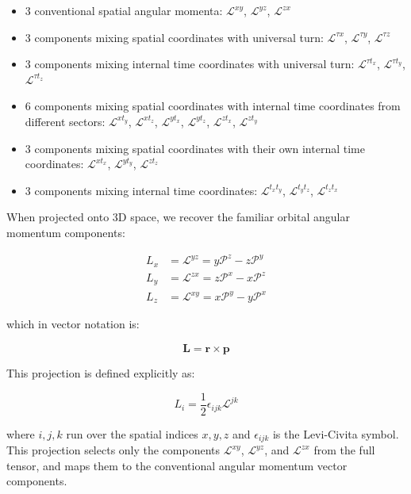 \documentclass{article}
\begin{document}
\begin{itemize}
\item 3 conventional spatial angular momenta: $\mathcal{L}^{xy}$, $\mathcal{L}^{yz}$, $\mathcal{L}^{zx}$
\item 3 components mixing spatial coordinates with universal turn: $\mathcal{L}^{\tau x}$, $\mathcal{L}^{\tau y}$, $\mathcal{L}^{\tau z}$
\item 3 components mixing internal time coordinates with universal turn: $\mathcal{L}^{\tau t_x}$, $\mathcal{L}^{\tau t_y}$, $\mathcal{L}^{\tau t_z}$
\item 6 components mixing spatial coordinates with internal time coordinates from different sectors: $\mathcal{L}^{x t_y}$, $\mathcal{L}^{x t_z}$, $\mathcal{L}^{y t_x}$, $\mathcal{L}^{y t_z}$, $\mathcal{L}^{z t_x}$, $\mathcal{L}^{z t_y}$
\item 3 components mixing spatial coordinates with their own internal time coordinates: $\mathcal{L}^{x t_x}$, $\mathcal{L}^{y t_y}$, $\mathcal{L}^{z t_z}$
\item 3 components mixing internal time coordinates: $\mathcal{L}^{t_x t_y}$, $\mathcal{L}^{t_y t_z}$, $\mathcal{L}^{t_z t_x}$
\end{itemize}

When projected onto 3D space, we recover the familiar orbital angular momentum components:

\begin{align}
L_x &= \mathcal{L}^{yz} = y\mathcal{P}^z - z\mathcal{P}^y \\
L_y &= \mathcal{L}^{zx} = z\mathcal{P}^x - x\mathcal{P}^z \\
L_z &= \mathcal{L}^{xy} = x\mathcal{P}^y - y\mathcal{P}^x
\end{align}

which in vector notation is:

\begin{equation}
\mathbf{L} = \mathbf{r} \times \mathbf{p}
\end{equation}

This projection is defined explicitly as:

\begin{equation}
L_i = \frac{1}{2}\epsilon_{ijk}\mathcal{L}^{jk}
\end{equation}

where $i,j,k$ run over the spatial indices $x,y,z$ and $\epsilon_{ijk}$ is the Levi-Civita symbol. This projection selects only the components $\mathcal{L}^{xy}$, $\mathcal{L}^{yz}$, and $\mathcal{L}^{zx}$ from the full tensor, and maps them to the conventional angular momentum vector components.
\end{document}
